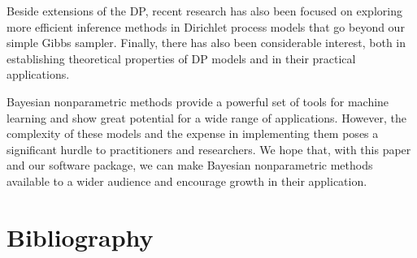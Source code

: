 \documentclass[final,3p,times,twocolumn]{elsarticle}
\begin{document}
Beside extensions of the DP, recent research has also been focused on exploring more efficient inference methods in Dirichlet process models that go beyond our simple Gibbs sampler.
Finally, there has also been considerable interest, both in establishing theoretical properties of DP models and in their practical applications.

Bayesian nonparametric methods provide a powerful set of tools for machine learning and show great potential for a wide range of applications. 
However, the complexity of these models and the expense in implementing them poses a significant hurdle to practitioners and researchers.
We hope that, with this paper and our software package, we can make Bayesian nonparametric methods available to a wider audience and encourage growth in their application.




\section*{Bibliography}

%







\end{document}
